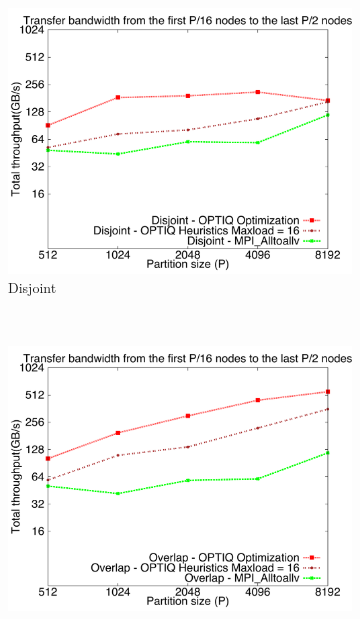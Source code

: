 \begin{figure}[!htbp]
        \centering
        \begin{subfigure}[b]{0.32\textwidth}
                \includegraphics[width=\textwidth]{figures/constantr_3.pdf}
                \caption{Disjoint}
                \label{fig:3_1024_hop}
        \end{subfigure}%
        ~ %
        \begin{subfigure}[b]{0.32\textwidth}
                \includegraphics[width=\textwidth]{figures/constantr_27}

\end{subfigure}
\end{figure}
